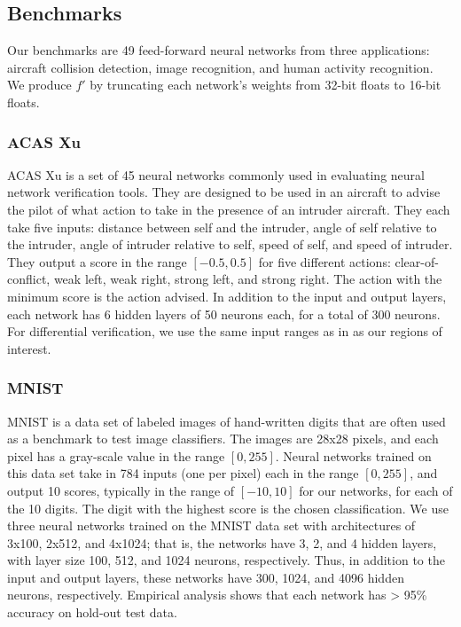 \subsection{Benchmarks}

Our benchmarks are 49 feed-forward neural networks
from three applications: aircraft collision detection, image
recognition, and human activity recognition. We produce $ f' $ by
truncating each network's weights from 32-bit floats to 16-bit
floats.


\subsubsection{ACAS Xu~\cite{JulianKO18}}

ACAS Xu is a set of 45 neural networks commonly used in evaluating
neural network verification tools. They are designed to be used in an
aircraft to advise the pilot of what action to take in the presence of
an intruder aircraft. They each take five inputs: distance between
self and the intruder, angle of self relative to the intruder, angle
of intruder relative to self, speed of self, and speed of
intruder. They output a score in the range $[-0.5, 0.5]$ for five
different actions: clear-of-conflict, weak left, weak right, strong
left, and strong right. The action with the minimum score is the action
advised.  In addition to the input and output layers, each network has
6 hidden layers of 50 neurons each, for a total of 300 neurons.  For
differential verification, we use the same input ranges as
in \cite{KatzBDJK17, WangPWYJ18} as our regions of interest.

\subsubsection{MNIST~\cite{LecunBBH98}}

MNIST is a data set of labeled images of hand-written digits that are
often used as a benchmark to test image classifiers. The images are
28x28 pixels, and each pixel has a gray-scale value in the range $[0,
255]$. Neural networks trained on this data set take in 784 inputs
(one per pixel) each in the range $[0, 255]$, and output 10
scores, typically in the range of $[-10, 10]$ for our networks, for each of the 10
digits. The digit with the highest score is the chosen classification.
%
We use three neural networks trained on the MNIST data set with
architectures of 3x100, 2x512, and 4x1024; that is, the networks have
3, 2, and 4 hidden layers, with layer size 100, 512, and 1024 neurons, respectively.  Thus,
in addition to the input and output layers, these networks have
300, 1024, and 4096 hidden neurons, respectively.  Empirical
analysis shows that each network has > 95\% accuracy on hold-out test
data.

